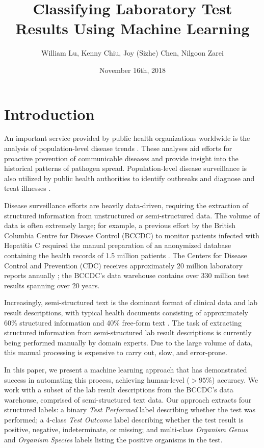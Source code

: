 \documentclass[12pt]{article}
\title{Classifying Laboratory Test Results Using Machine Learning}
\author{William Lu, Kenny Chiu, Joy (Sizhe) Chen, Nilgoon Zarei}
\date{November 16th, 2018}
\begin{document}
\maketitle

\section{Introduction}

An important service provided by public health organizations worldwide is the analysis of population-level disease trends \cite{bc_centre_for_disease_control} \cite{surveillance_strategy_report_electronic}. These analyses aid efforts for proactive prevention of communicable diseases and provide insight into the historical patterns of pathogen spread. Population-level disease surveillance is also utilized by public health authorities to identify outbreaks and diagnose and treat illnesses \cite{surveillance_strategy_report_electronic}.

Disease surveillance efforts are heavily data-driven, requiring the extraction of structured information from unstructured or semi-structured data. The volume of data is often extremely large; for example, a previous effort by the British Columbia Centre for Disease Control (BCCDC) to monitor patients infected with Hepatitis C required the manual preparation of an anonymized database containing the health records of 1.5 million patients \cite{bccdc_publishes_new_findings}. The Centers for Disease Control and Prevention (CDC) receives approximately 20 million laboratory reports annually \cite{surveillance_strategy_report_electronic}; the BCCDC's data warehouse contains over 330 million test results spanning over 20 years.

Increasingly, semi-structured text is the dominant format of clinical data and lab result descriptions, with typical health documents consisting of approximately 60\% structured information and 40\% free-form text \cite{text_mining_and_information} \cite{the_stockholm_epr_corpus}. The task of extracting structured information from semi-structured lab result descriptions is currently being performed manually by domain experts. Due to the large volume of data, this manual processing is expensive to carry out, slow, and error-prone.


In this paper, we present a machine learning approach that has demonstrated success in automating this process, achieving human-level ($>95\%$) accuracy. We work with a subset of the lab result descriptions from the BCCDC's data warehouse, comprised of semi-structured text data. Our approach extracts four structured labels: a binary \textit{Test Performed} label describing whether the test was performed; a 4-class \textit{Test Outcome} label describing whether the test result is positive, negative, indeterminate, or missing; and multi-class \textit{Organism Genus} and \textit{Organism Species} labels listing the positive organisms in the test.
\end{document}

